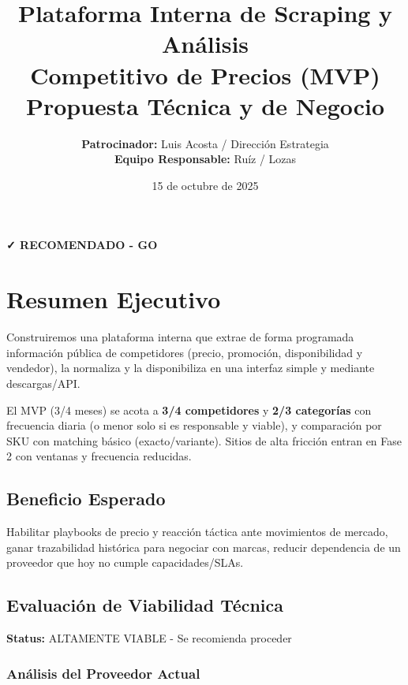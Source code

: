 \documentclass[12pt,a4paper]{article}
\title{
    \LARGE\textbf{Plataforma Interna de Scraping y Análisis\\Competitivo de Precios (MVP)}\\
    \vspace{0.5cm}
    \large Propuesta Técnica y de Negocio
}
\author{
    \textbf{Patrocinador:} Luis Acosta / Dirección Estrategia\\
    \textbf{Equipo Responsable:} Ruíz / Lozas
}
\date{15 de octubre de 2025}
\begin{document}
\maketitle
\thispagestyle{empty}

\vspace{1cm}
\begin{center}
    \Large
    \textcolor{successgreen}{\textbf{✓ RECOMENDADO - GO}}
\end{center}

\newpage
\tableofcontents
\newpage

\section{Resumen Ejecutivo}

Construiremos una plataforma interna que extrae de forma programada información pública de competidores (precio, promoción, disponibilidad y vendedor), la normaliza y la disponibiliza en una interfaz simple y mediante descargas/API.

El MVP (3/4 meses) se acota a \textbf{3/4 competidores} y \textbf{2/3 categorías} con frecuencia diaria (o menor solo si es responsable y viable), y comparación por SKU con matching básico (exacto/variante). Sitios de alta fricción entran en Fase 2 con ventanas y frecuencia reducidas.

\subsection*{Beneficio Esperado}

Habilitar playbooks de precio y reacción táctica ante movimientos de mercado, ganar trazabilidad histórica para negociar con marcas, reducir dependencia de un proveedor que hoy no cumple capacidades/SLAs.

\subsection*{Evaluación de Viabilidad Técnica}

\textbf{Status:} \textcolor{successgreen}{ALTAMENTE VIABLE - Se recomienda proceder}

\subsubsection*{Análisis del Proveedor Actual}
\end{document}
